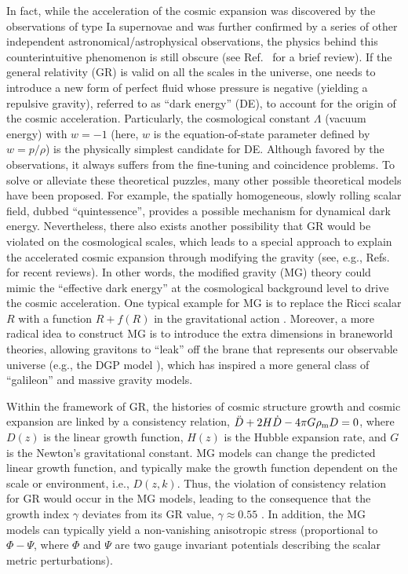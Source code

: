 \documentclass[aps,prd,nofootinbib,amsmath,amssymb,twocolumn,superscriptaddress,10pt]{revtex4}%
\begin{document}
In fact, while the acceleration of the cosmic expansion was discovered by the {observations of type Ia supernovae} and was {further} confirmed by {a series of} other independent astronomical/astrophysical observations, the physics behind this {counterintuitive phenomenon} is still obscure (see Ref.~\cite{Mortonson:2013zfa} for a brief review). If the general relativity (GR) is valid on all the scales in the universe, one needs to introduce a new form of {perfect fluid} whose pressure is negative (yielding a repulsive gravity), referred to as ``dark energy'' (DE), to account for the origin of the cosmic acceleration. {Particularly, the cosmological constant $\Lambda$ (vacuum energy) with $w=-1$ (here, $w$ is the equation-of-state parameter defined by $w=p/\rho$) is the physically simplest candidate for DE. Although favored by the observations, it always suffers from the fine-tuning and coincidence problems. To solve or alleviate these theoretical puzzles, many other possible theoretical models have been proposed. For example, the spatially homogeneous, slowly rolling scalar field, dubbed ``quintessence'', provides a possible mechanism for dynamical dark energy}. Nevertheless, there also exists another possibility that GR would be violated on the cosmological scales, which leads to a special approach to explain the accelerated cosmic expansion through modifying the gravity (see, e.g., Refs.~\cite{Sotiriou:2008rp,DeFelice:2010aj,Clifton:2011jh,Weinberg:2012es,Joyce:2014kja} for recent reviews). In other words, the modified gravity (MG) theory could mimic the  {``effective dark energy'' at the cosmological background level to drive the cosmic acceleration}. One typical example for MG is to replace the Ricci scalar $R$ with a function $R+f(R)$ in the gravitational action \cite{Carroll:2003wy}. {Moreover, a more radical idea to construct MG is to introduce the extra dimensions in braneworld theories, allowing gravitons to ``leak'' off the brane that represents our observable universe} (e.g., the DGP model \cite{DGP}), which has inspired a more general class of ``galileon'' and massive gravity models.


{Within the framework of GR}, the histories of cosmic structure growth and cosmic expansion are linked by a consistency relation, $\ddot{D}+2H\dot{D}-4\pi G \rho_{\rm m} D=0$, where $D(z)$ is the linear growth function, $H(z)$ is the Hubble expansion rate, and $G$ is the Newton's gravitational constant. MG models can change the predicted linear growth function, and typically make the growth function dependent on the scale or environment, i.e., $D(z,k)$. Thus, {the violation of consistency relation for GR would occur in the MG models, leading to the consequence that the growth index $\gamma$ deviates from its GR value}, $\gamma\approx 0.55$ \cite{Wang:1998gt,Linder:2005in}. In addition, the MG models can typically yield a non-vanishing anisotropic stress (proportional to $\Phi-\Psi$, where $\Phi$ and $\Psi$ are two gauge invariant potentials describing the scalar metric perturbations).
\end{document}
